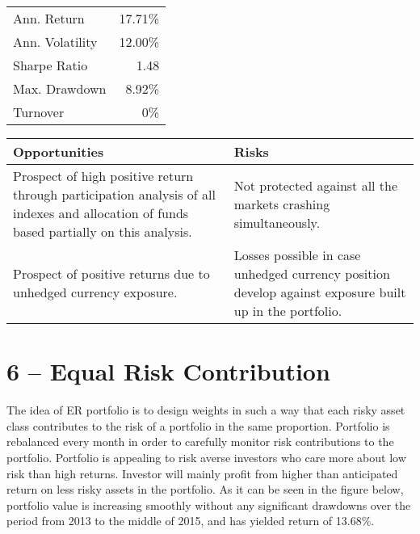 \documentclass{scrreprt}
\begin{document}
\vspace{\abovedisplayskip}
\begin{minipage}{0.65\textwidth}
\end{minipage}
\begin{minipage}{0.35\textwidth}
\begin{tabular}{lr}
\toprule
Ann. Return & 17.71\%\\
Ann. Volatility & 12.00\%\\
Sharpe Ratio & 1.48\\
Max. Drawdown & 8.92\% \\
Turnover & 0\%\\
\bottomrule
\end{tabular}
\end{minipage}

\begin{table}[H]
\begin{tabularx}{\textwidth}{XX}
  \toprule
  \textbf{\textsf{Opportunities}} & \textbf{\textsf{Risks}} \\
  \midrule
Prospect of high positive return through participation analysis of all indexes and allocation of funds based partially on this analysis. &
Not protected against all the markets crashing simultaneously. \\[1em]
Prospect of positive returns due to unhedged currency exposure. &
Losses possible in case unhedged currency position develop against exposure built up in the portfolio.\\
  \bottomrule
\end{tabularx}
\end{table}

\newpage\section*{6 -- Equal Risk Contribution}
The idea of ER portfolio is to design weights in such a way that each risky asset class contributes to the risk of a portfolio in the same proportion.
Portfolio is rebalanced every month in order to carefully monitor risk contributions to the portfolio.
Portfolio is appealing to risk averse investors who care more about low risk than high returns.
Investor will mainly profit from higher than anticipated return on less risky assets in the portfolio.
As it can be seen in the figure below, portfolio value is increasing smoothly without any significant drawdowns over the period from 2013 to the middle of 2015, and has yielded return of 13.68\%.
\end{document}

